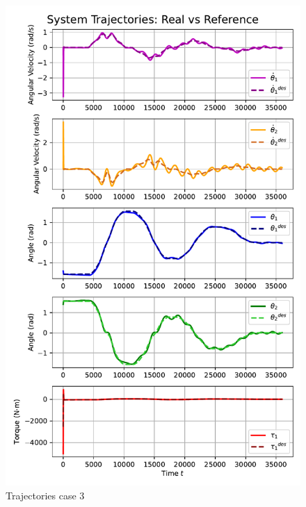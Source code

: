 \begin{figure}[htb]
    \centering
    \includegraphics[width=1\linewidth]{img/3-task3/LQR3.pdf}
    \caption{Trajectories case 3}
    \label{fig:dtheta1-evolution}
\end{figure}

